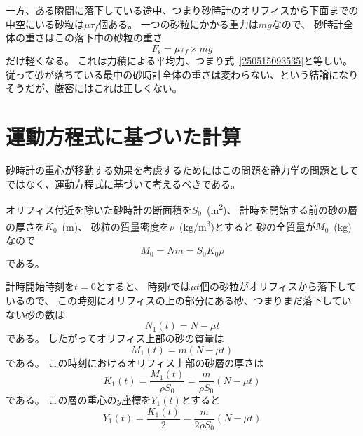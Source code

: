 \documentclass[]{article}
\begin{document}
一方、ある瞬間に落下している途中、つまり砂時計のオリフィスから下面までの中空にいる砂粒は$\mu \tau_f$個ある。
一つの砂粒にかかる重力は$mg$なので、
砂時計全体の重さはこの落下中の砂粒の重さ
\begin{equation} \label{250513083619} 
   F_\mathrm{s} = \mu \tau_f\times mg 
\end{equation}
だけ軽くなる。
これは力積による平均力、つまり式~\eqref{250515093535}と等しい。
従って砂が落ちている最中の砂時計全体の重さは変わらない、という結論になりそうだが、厳密にはこれは正しくない。


\section{運動方程式に基づいた計算}

砂時計の重心が移動する効果を考慮するためにはこの問題を静力学の問題としてではなく、運動方程式に基づいて考えるべきである。


オリフィス付近を除いた砂時計の断面積を$S_0$~(\si{m^2})、
計時を開始する前の砂の層の厚さを$K_0$~(m)、
砂粒の質量密度を$\rho$~(\si{kg/m^3})とすると
砂の全質量が$M_0$~(\si{kg})なので
\begin{equation} \label{250703152145} 
   M_0 = N m = S_0 K_0 \rho
\end{equation}
である。


計時開始時刻を$t=0$とすると、
時刻$t$では$\mu t$個の砂粒がオリフィスから落下しているので、
この時刻にオリフィスの上の部分にある砂、つまりまだ落下していない砂の数は
\begin{equation} \label{250703152453} 
   N_1(t) =  N - \mu t
\end{equation}
である。
したがってオリフィス上部の砂の質量は
\begin{equation} \label{250703152655} 
   M_1(t) = m (N-\mu t)
\end{equation}
である。
この時刻におけるオリフィス上部の砂層の厚さは
\begin{equation} \label{250703152748} 
   K_1(t) = \frac{M_1(t)}{\rho S_0} = \frac{m}{\rho S_0}(N-\mu t)
\end{equation}
である。
この層の重心の$y$座標を$Y_1(t)$とすると
\begin{equation} \label{250703153013} 
   Y_1(t) = \frac{K_1(t)}{2} = \frac{m}{2\rho S_0} ( N - \mu t)
\end{equation}
\end{document}
